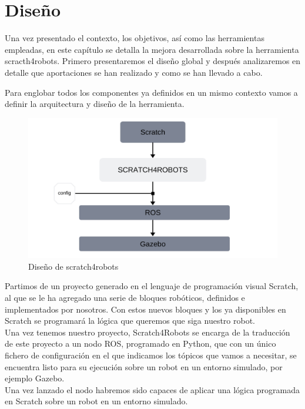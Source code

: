 \section{Diseño}
\label{sec:diseno}

Una vez presentado el contexto, los objetivos, así como las herramientas empleadas,
en este capítulo se detalla la mejora desarrollada sobre la herramienta scracth4robots.
Primero presentaremos el diseño global y después analizaremos en detalle que aportaciones se han realizado y como se han llevado a cabo.

Para englobar todos los componentes ya definidos en un mismo contexto vamos a definir la arquitectura y diseño de la herramienta.\\

\begin{figure}[H]
    \centering
    \includegraphics[scale=0.30]{img/diseno.jpg}
  	\caption{Diseño de scratch4robots}
  	\label{fig:s4r}
\end{figure}

Partimos de un proyecto generado en el lenguaje de programación visual Scratch, al que se le ha agregado una serie de bloques robóticos, definidos e implementados por nosotros. Con estos nuevos bloques y los ya disponibles en Scratch se programará la lógica que queremos que siga nuestro robot.\\

Una vez tenemos nuestro proyecto, Scratch4Robots se encarga de la traducción de este proyecto a un nodo ROS, programado en Python, que con un único fichero de configuración en el que indicamos los tópicos que vamos a necesitar, se encuentra listo para su ejecución sobre un robot en un entorno simulado, por ejemplo Gazebo.\\

Una vez lanzado el nodo habremos sido capaces de aplicar una lógica programada en Scratch sobre un robot en un entorno simulado.


